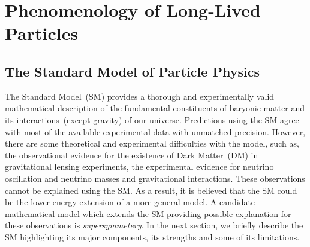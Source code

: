 
\chapter{Phenomenology of Long-Lived Particles}
\label{Long_Lived_Particle_physics_chapter}


\section{The Standard Model of Particle Physics}
The Standard Model~(SM) provides a thorough and experimentally valid mathematical description of the fundamental constituents of baryonic matter and its interactions~(except gravity) of our universe. Predictions using the SM agree with most of the available experimental data with unmatched precision.
However, there are some theoretical and experimental difficulties with the model, such as, the observational evidence for the existence of Dark Matter~(DM) in gravitational lensing experiments, the experimental evidence for neutrino oscillation and neutrino masses and gravitational interactions. These observations cannot be explained using the SM.  As a result, it is believed that the SM could be the lower energy extension of a more general model. A candidate mathematical model which extends the SM providing possible explanation for these observations is \textit{supersymmetery}.
In the next section, we briefly describe the SM highlighting its major components, its strengths and some of its limitations.
